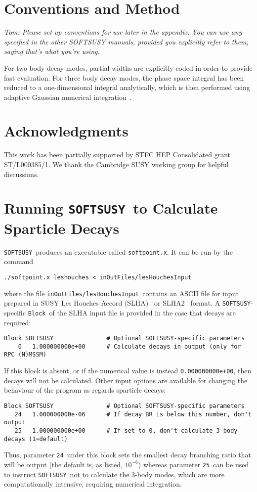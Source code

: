 \documentclass[final,3p,times,pdflatex]{elsarticle}
\def\SOFTSUSY{{\tt SOFTSUSY}}
\def\code#1{{\tt #1}}
\begin{document}
\cite{Allanach:2001kg,Allanach:2013kza,Allanach:2009bv,Allanach:2011de,Allanach:2014nba,Allanach:2016rxd}

\section{Conventions and Method}
{\em Tom: Please set up conventions for use later in the appendix. You can use
any specified in the other SOFTSUSY manuals, provided you explicitly refer to
them, saying that's what you're using.}

For two body decay modes, partial widths are explicitly coded in order to
provide fast evaluation. For three body decay modes, the phase space integral
has been reduced to a one-dimensional integral analytically, which is then
performed using adaptive Gaussian numerical integration~\cite{numRec}.

\section*{Acknowledgments}
This work has been partially supported by STFC HEP Consolidated grant 
ST/L000385/1. We thank the Cambridge SUSY working group for helpful
discussions. 

\appendix

\section{Running \SOFTSUSY~to Calculate Sparticle Decays}  
\label{sec:run}

\SOFTSUSY~produces an executable called \code{softpoint.x}. It can be run by
the command
\begin{verbatim}
./softpoint.x leshouches < inOutFiles/lesHouchesInput
\end{verbatim}
where the file \code{inOutFiles/lesHouchesInput}~contains an ASCII file
for input
prepared in SUSY Les Houches Accord (SLHA)~\cite{Skands:2003cj} or
SLHA2~\cite{Allanach:2008qq} format. 
A \code{SOFTSUSY}-specific \code{Block}~of the SLHA input file is provided in
the case that decays are required:
\begin{verbatim}
Block SOFTSUSY               # Optional SOFTSUSY-specific parameters
    0   1.000000000e+00      # Calculate decays in output (only for RPC (N)MSSM)
\end{verbatim}
If this block is absent, or if the numerical value is instead
\code{0.000000000e+00}, then decays will not be calculated. 
Other input options are available for changing the behaviour of the program as
regards sparticle decays:
\begin{verbatim}
Block SOFTSUSY               # Optional SOFTSUSY-specific parameters
   24   1.000000000e-06      # If decay BR is below this number, don't output
   25   1.000000000e+00	     # If set to 0, don't calculate 3-body decays (1=default)
\end{verbatim}
Thus, parameter \code{24}~under this block sets the smallest decay branching
ratio that will be output (the default is, as listed, $10^{-6}$) whereas 
parameter \code{25}~can be used to instruct \code{SOFTSUSY}~not to calculate
the 3-body modes, which are more computationally intensive, requiring
numerical integration. 
\end{document}
